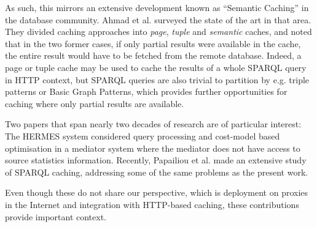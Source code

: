 As such, this mirrors an extensive development known as ``Semantic
Caching'' in the database community. Ahmad et al. \cite{4777801}
surveyed the state of the art in that area. They divided caching
approaches into \emph{page}, \emph{tuple} and \emph{semantic} caches,
and noted that in the two former cases, if only partial results were
available in the cache, the entire result would have to be fetched
from the remote database. Indeed, a page or tuple cache may be used to
cache the results of a whole SPARQL query in HTTP context, but SPARQL
queries are also trivial to partition by e.g. triple patterns or Basic
Graph Patterns, which provides further opportunities for caching where
only partial results are available.

Two papers that span nearly two decades of research are of particular
interest: The HERMES system \cite{adali1996query} considered query
processing and cost-model based optimisation in a mediator system
where the mediator does not have access to source statistics
information. Recently, Papailiou et al. \cite{papailiou2015graph}
made an extensive study of SPARQL caching, addressing some of the same
problems as the present work.

Even though these do not share our perspective, which is deployment on
proxies in the Internet and integration with HTTP-based caching, these
contributions provide important context. 

